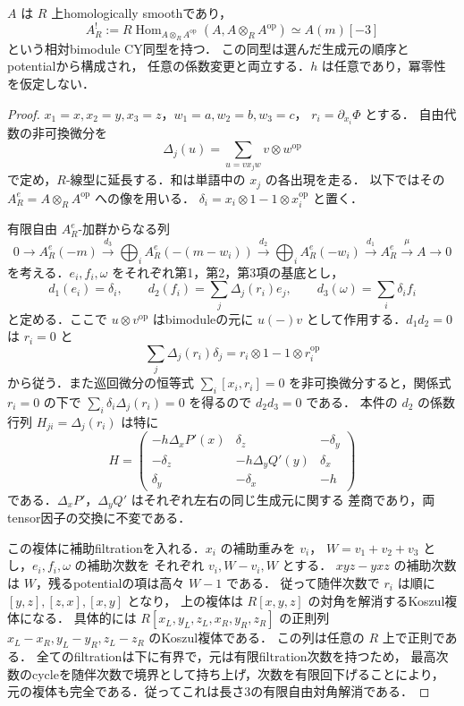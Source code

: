 \begin{proposition}\label{prop:finite-separated-relative-cy}
$A$ は $R$ 上homologically smoothであり，
\[
 A^!_R:=R\!\operatorname{Hom}_{A\otimes_R A^{\mathrm{op}}}
          (A,A\otimes_R A^{\mathrm{op}})
       \simeq A(m)[-3]
\]
という相対bimodule CY同型を持つ．
この同型は選んだ生成元の順序とpotentialから構成され，
任意の係数変更と両立する．$h$ は任意であり，冪零性を仮定しない．
\end{proposition}
\begin{proof}
$x_1=x,x_2=y,x_3=z$，$w_1=a,w_2=b,w_3=c$，
$r_i=\partial_{x_i}\Phi$ とする．
自由代数の非可換微分を
\[
 \Delta_j(u)=\sum_{u=vx_jw}v\otimes w^{\mathrm{op}}
\]
で定め，$R$-線型に延長する．和は単語中の $x_j$ の各出現を走る．
以下ではその $A^e_R=A\otimes_R A^{\mathrm{op}}$ への像を用いる．
$\delta_i=x_i\otimes1-1\otimes x_i^{\mathrm{op}}$ と置く．

有限自由 $A^e_R$-加群からなる列
\[
 0\longrightarrow A^e_R(-m)
 \xrightarrow{d_3}
 \bigoplus_i A^e_R(-(m-w_i))
 \xrightarrow{d_2}
 \bigoplus_i A^e_R(-w_i)
 \xrightarrow{d_1} A^e_R
 \xrightarrow{\mu} A\longrightarrow0
\]
を考える．$e_i,f_i,\omega$ をそれぞれ第1，第2，第3項の基底とし，
\[
 d_1(e_i)=\delta_i,\qquad
 d_2(f_i)=\sum_j\Delta_j(r_i)e_j,\qquad
 d_3(\omega)=\sum_i\delta_i f_i
\]
と定める．ここで $u\otimes v^{\mathrm{op}}$ はbimoduleの元に
$u(-)v$ として作用する．$d_1d_2=0$ は $r_i=0$ と
\[
 \sum_j\Delta_j(r_i)\delta_j
       =r_i\otimes1-1\otimes r_i^{\mathrm{op}}
\]
から従う．また巡回微分の恒等式
$\sum_i[x_i,r_i]=0$ を非可換微分すると，関係式 $r_i=0$ の下で
$\sum_i\delta_i\Delta_j(r_i)=0$ を得るので $d_2d_3=0$ である．
本件の $d_2$ の係数行列 $H_{ji}=\Delta_j(r_i)$ は特に
\[
 H=\begin{pmatrix}
 -h\Delta_xP'(x)&\delta_z&-\delta_y\\
 -\delta_z&-h\Delta_yQ'(y)&\delta_x\\
 \delta_y&-\delta_x&-h
 \end{pmatrix}
\]
である．$\Delta_xP'$，$\Delta_yQ'$ はそれぞれ左右の同じ生成元に関する
差商であり，両tensor因子の交換に不変である．

この複体に補助filtrationを入れる．$x_i$ の補助重みを $v_i$，
$W=v_1+v_2+v_3$ とし，$e_i,f_i,\omega$ の補助次数を
それぞれ $v_i,W-v_i,W$ とする．
$xyz-yxz$ の補助次数は $W$，残るpotentialの項は高々 $W-1$ である．
従って随伴次数で $r_i$ は順に $[y,z],[z,x],[x,y]$ となり，
上の複体は $R[x,y,z]$ の対角を解消するKoszul複体になる．
具体的には $R[x_L,y_L,z_L,x_R,y_R,z_R]$ の正則列
$x_L-x_R,y_L-y_R,z_L-z_R$ のKoszul複体である．
この列は任意の $R$ 上で正則である．
全てのfiltrationは下に有界で，元は有限filtration次数を持つため，
最高次数のcycleを随伴次数で境界として持ち上げ，次数を有限回下げることにより，
元の複体も完全である．従ってこれは長さ3の有限自由対角解消である．


\end{proof}
